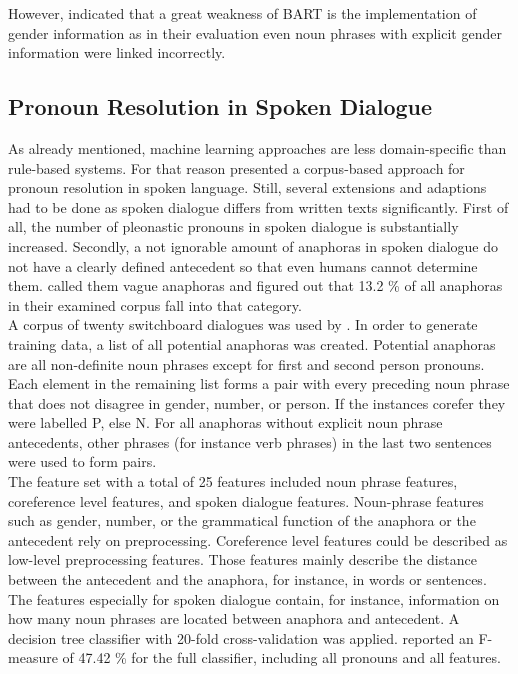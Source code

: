 However, \cite{reiteretal:2011b} indicated that a great weakness of BART is the implementation of gender information as in their evaluation even noun phrases with explicit gender information were linked incorrectly.

\subsection{Pronoun Resolution in Spoken Dialogue}
As already mentioned, machine learning approaches are less domain-specific than rule-based systems. For that reason \cite{strube2003machine} presented a corpus-based approach for pronoun resolution in spoken language. Still, several extensions and adaptions had to be done as spoken dialogue differs from written texts significantly. First of all, the number of pleonastic pronouns in spoken dialogue is substantially increased. Secondly, a not ignorable amount of anaphoras in spoken dialogue do not have a clearly defined antecedent so that even humans cannot determine them. \cite{eckert2000dialogue} called them vague anaphoras and figured out that 13.2 \% of all anaphoras in their examined corpus fall into that category.\\
A corpus of twenty switchboard dialogues was used by \cite{strube2003machine}. In order to generate training data, a list of all potential anaphoras was created. Potential anaphoras are all non-definite noun phrases except for first and second person pronouns. Each element in the remaining list forms a pair with every preceding noun phrase that does not disagree in gender, number, or person. If the instances corefer they were labelled P, else N. For all anaphoras without explicit noun phrase antecedents, other phrases (for instance verb phrases) in the last two sentences were used to form pairs. \\
The feature set with a total of 25 features included noun phrase features, coreference level features, and spoken dialogue features. Noun-phrase features such as gender, number, or the grammatical function of the anaphora or the antecedent rely on preprocessing. Coreference level features could be described as low-level preprocessing features. Those features mainly describe the distance between the antecedent and the anaphora, for instance, in words or sentences. The features especially for spoken dialogue contain, for instance, information on how many noun phrases are located between anaphora and antecedent.
A decision tree classifier with 20-fold cross-validation was applied. \citep{strube2003machine} reported an F-measure of 47.42 \% for the full classifier, including all pronouns and all features. 

